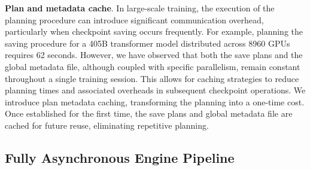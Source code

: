 \noindent \textbf{Plan and metadata cache}. In large-scale training, the execution of the planning procedure can introduce significant communication overhead, particularly when checkpoint saving occurs frequently.
For example, planning the saving procedure for a 405B transformer model distributed across 8960 GPUs requires 62 seconds.
However, we have observed that both the save plans and the global metadata file, although coupled with specific parallelism, remain constant throughout a single training session.
This allows for 
caching strategies to reduce planning times and associated overheads in subsequent checkpoint operations.
We introduce plan metadata caching, transforming the planning into a one-time cost.
Once established for the first time, the save plans and global metadata file are cached for future reuse,
eliminating repetitive planning.
\subsection{Fully Asynchronous Engine Pipeline}
\label{sec:opt_pipeline}

